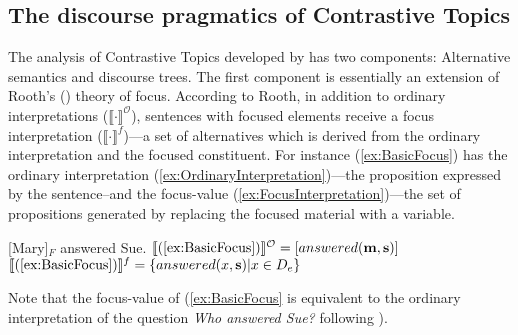 \documentclass[
	letterpaper,
]{article}
\begin{document}
\subsection{The discourse pragmatics of Contrastive Topics \parencite{buring2003d,buring2016topic}}\label{sec:BuringCT}
The analysis of Contrastive Topics developed by \textcite{buring2003d} has two components: Alternative semantics and discourse trees.
The first component is essentially an extension of Rooth's (\citeyear{rooth1992theory}) theory of focus.
According to Rooth, in addition to ordinary interpretations ($\llbracket\cdot\rrbracket^\mathcal{O}$), sentences with focused elements receive a focus interpretation ($\llbracket\cdot\rrbracket^f$)---a set of alternatives which is derived from the ordinary interpretation and the focused constituent.
For instance (\ref{ex:BasicFocus}) has the ordinary interpretation (\ref{ex:OrdinaryInterpretation})---the proposition expressed by the sentence--and the focus-value (\ref{ex:FocusInterpretation})---the set of propositions generated by replacing the focused material with a variable.
\begin{exe}
	\ex\label{ex:BasicFocus}{[Mary]$_F$ answered Sue.}
	\ex\label{ex:OrdinaryInterpretation} $\llbracket(\ref{ex:BasicFocus})\rrbracket^\mathcal{O} = [answered(\mathbf{m}, \mathbf{s})]$
	\ex\label{ex:FocusInterpretation} $\llbracket(\ref{ex:BasicFocus})\rrbracket^f = \left\{ answered(x, \mathbf{s}) | x \in D_e \right\}$
\end{exe}
Note that the focus-value of (\ref{ex:BasicFocus} is equivalent to the ordinary interpretation of the question \textit{Who answered Sue?} following \textcite{hamblin1973questions}).
\end{document}
